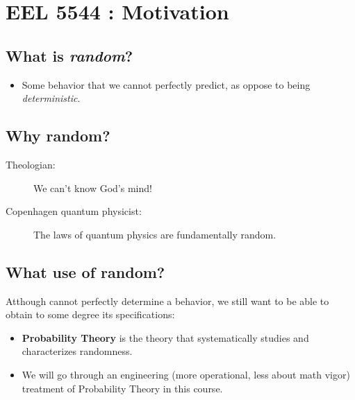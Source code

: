 
\section{EEL 5544 : Motivation}
\subsection{What is \emph{random}?}
\begin{itemize}
  \item Some behavior that we cannot perfectly predict, as oppose to
    being \emph{deterministic}.
\end{itemize}

\subsection{Why random?}
\begin{description}
\item[Theologian:]  We can't know God's mind! 
\item[Copenhagen quantum physicist:] The laws of quantum physics are fundamentally random.
\end{description}
  
 \subsection{What use of random?}
Atthough cannot perfectly determine a behavior, we still want to be
able to obtain to some degree its specifications:
\begin{itemize}
  \item \textbf{Probability Theory} is the theory that systematically studies and characterizes randomness.
  \item We will go through an engineering (more operational, less
    about math vigor) treatment of Probability Theory in this course.
\end{itemize}


